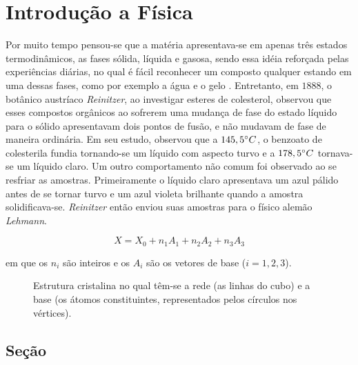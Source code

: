 ﻿\chapter[INTRODUÇÃO A FÍSICA ]{Introdução a Física }
\label{cap1}


Por muito tempo pensou-se que a matéria apresentava-se em apenas três estados termodinâmicos, as fases sólida, líquida e gasosa, sendo essa idéia reforçada pelas experiências diárias, no qual é fácil reconhecer um composto qualquer estando em uma dessas fases, como por exemplo a água e o gelo \cite{sing,degennes}. Entretanto, em $1888$, o botânico austríaco \textsl{Reinitzer}, ao investigar esteres de colesterol, observou que esses compostos orgânicos ao sofrerem uma mudança de fase do estado líquido para o sólido apresentavam dois pontos de fusão, e não mudavam de fase de maneira ordinária. Em seu estudo, observou que a $145,5 ^\circ C$, o benzoato de colesterila fundia tornando-se um líquido com aspecto turvo e a $178,5 ^\circ C$ tornava-se um líquido claro. Um outro comportamento não comum foi observado ao se resfriar as amostras. Primeiramente o líquido claro apresentava um azul pálido antes de se tornar turvo e um azul violeta brilhante quando a amostra solidificava-se. \textsl{Reinitzer} então enviou suas amostras para o físico alemão \textsl{Lehmann}.


\begin{equation}
X=X_{0}+n_{1}A_{1}+n_{2}A_{2}+n_{3}A_{3} 
\end{equation}

\noindent em que os $n_{i}$ são inteiros e os $A_{i}$ são os vetores de base ($i=1,2,3$). %

\begin{figure}[ht]
\centering
\caption{Estrutura cristalina no qual têm-se a rede (as linhas do cubo) e a base (os átomos constituintes, representados pelos círculos nos vértices).}
\label{figcrist}
\end{figure}





\section{Seção}



